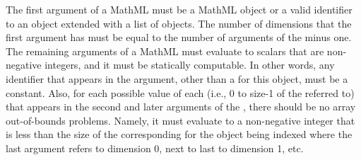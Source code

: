 The first argument of a MathML  must be a MathML
 object or a valid identifier to an \SBase object extended
with a list of \Dimension objects.   The number of dimensions that the
first argument has must be equal to the number of arguments of the
 minus one. The remaining arguments of a MathML
 must evaluate to scalars that are non-negative integers, and it must be statically computable.   In other words, any identifier that appears in the argument, other than a \Dimension {} for this object, must be a constant.   Also, for each possible value of each \Dimension {}  (i.e., 0 to size-1 of the \Dimension referred to) that appears in the second and later arguments of the , there should be no array out-of-bounds problems.
Namely, it must evaluate to a non-negative integer that is less than the size of the corresponding \Dimension for the object being indexed where the last argument refers to dimension 0, next to last to dimension 1, etc.

